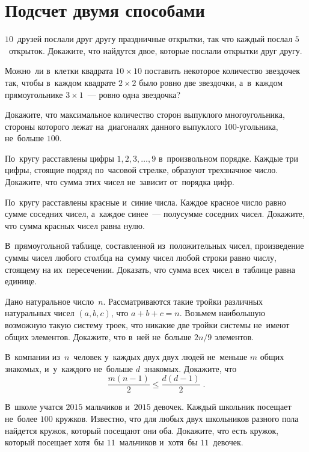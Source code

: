 
\section*{Подсчет двумя способами}


\begin{problems}

\item
$10$~друзей послали друг другу праздничные открытки, так что каждый послал
$5$~открыток.
Докажите, что найдутся двое, которые послали открытки друг другу.

\item
Можно~ли в~клетки квадрата $10 \times 10$ поставить некоторое количество
звездочек так, чтобы в~каждом квадрате $2 \times 2$ было ровно две звездочки,
а~в~каждом прямоугольнике $3 \times 1$~--- ровно одна звездочка?

\item
Докажите, что максимальное количество сторон выпуклого многоугольника, стороны
которого лежат на~диагоналях данного выпуклого $100$-угольника, не~больше
$100$.

\item
По~кругу расставлены цифры $1, 2, 3,\ldots, 9$ в~произвольном порядке.
Каждые три цифры, стоящие подряд по~часовой стрелке, образуют трехзначное
число.
Докажите, что сумма этих чисел не~зависит от~порядка цифр.

\item
По~кругу расставлены красные и~синие числа.
Каждое красное число равно сумме соседних чисел, а~каждое синее~--- полусумме
соседних чисел.
Докажите, что сумма красных чисел равна нулю.

\item
В~прямоугольной таблице, составленной из~положительных чисел, произведение
суммы чисел любого столбца на~сумму чисел любой строки равно числу, стоящему
на их~пересечении.
Доказать, что сумма всех чисел в~таблице равна единице.

\item
Дано натуральное число~$n$.
Рассматриваются такие тройки различных натуральных чисел $(a, b, c)$, что
$a + b + c = n$.
Возьмем наибольшую возможную такую систему троек, что никакие две тройки
системы не~имеют общих элементов.
Докажите, что в~ней не~больше $2 n / 9$ элементов.

\item
В~компании из~$n$~человек у~каждых двух двух людей не~меньше $m$ общих
знакомых, и~у~каждого не~больше $d$~знакомых.
Докажите, что
\[
    \frac{m (n - 1)}{2}
\leq
    \frac{d (d - 1)}{2}
\;.\]

\item
В~школе учатся $2015$ мальчиков и~$2015$ девочек.
Каждый школьник посещает не~более $100$ кружков.
Известно, что для любых двух школьников разного пола найдется кружок, который
посещают они оба.
Докажите, что есть кружок, который посещает хотя~бы $11$~мальчиков и~хотя~бы
$11$~девочек.

\end{problems}

